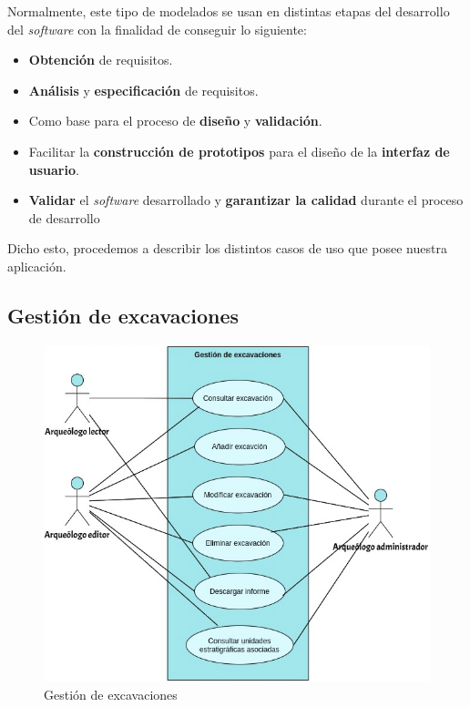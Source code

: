 Normalmente, este tipo de modelados se usan en distintas etapas del desarrollo del
\textit{software} con la finalidad de conseguir lo siguiente:

    \begin{itemize}
        \item \textbf{Obtención} de requisitos.
        \item \textbf{Análisis} y \textbf{especificación} de requisitos.
        \item Como base para el proceso de \textbf{diseño} y \textbf{validación}.
        \item Facilitar la \textbf{construcción de prototipos} para el diseño de la
        \textbf{interfaz de usuario}.
        \item \textbf{Validar} el \textit{software} desarrollado y \textbf{garantizar la
        calidad} durante el proceso de desarrollo
    \end{itemize}

Dicho esto, procedemos a describir los distintos casos de uso que posee nuestra aplicación.

\subsection{Gestión de excavaciones}
    \begin{figure}[H]
        \centering
        \includegraphics[scale=0.50]{imagenes/diagramas CU/excavation-UC.png}
        \caption{Gestión de excavaciones}
        \label{fig:excavation-management}
    \end{figure}

